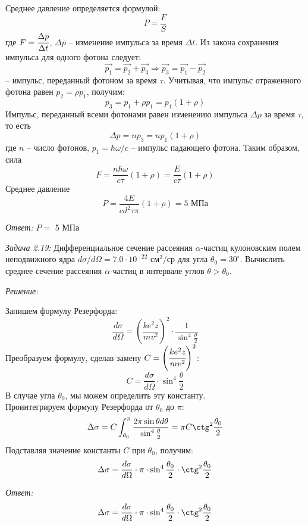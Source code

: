 Среднее давление определяется формулой:
	\[ P = \frac{F}{S} \]
где \( F = \cfrac{\Delta p}{\Delta t} \), 
	\( \Delta p \) -- изменение импульса за время \( \Delta t \).
Из закона сохранения импульса для одного фотона следует:
	\[ 
		\vec{p_1} = \vec{p_2} + \vec{p_3} \Rightarrow 
		\vec{p_3} = \vec{p_1} - \vec{p_2}
	\]
-- импульс, переданный фотоном за время \( \tau \). Учитывая,
что импульс отраженного фотона равен \( p_2 = \rho p_1 \),
получим:
	\[ p_3 = p_1 + \rho p_1 = p_1(1+\rho) \]
Импульс, переданный всеми фотонами равен изменению импульса 
\( \Delta p \) за время \( \tau \), то есть
	\[ \Delta p = np_3 = np_1(1+\rho) \]
где \( n \) -- число фотонов, \( p_1 = \hbar\omega/c \) --
импульс падающего фотона. Таким образом, сила
	\[ 
		F = \frac{n\hbar\omega}{c\tau}(1+\rho) 
		  = \frac{E}{c\tau}(1+\rho)
	\]
Среднее давление
	\[ P = \frac{4E}{cd^2\tau\pi}(1+\rho) = 5\text{ МПа} \]

\emph{Ответ:} \( P = \) 5 МПа

\newpage


\emph{Задача 2.19: }
Дифференциальное сечение рассеяния \( \alpha \)-частиц кулоновским полем неподвижного 
ядра \( d\sigma/d\Omega = 7.0\cdot10^{-22} \text{ см}^2/\text{ср} \)
для угла \( \theta_0 = 30^{\circ} \). Вычислить среднее сечение рассеяния 
\( \alpha \)-частиц в интервале углов \( \theta > \theta_0 \).

\emph{Решение:}

Запишем формулу Резерфорда:
\[ 
	\frac{d\sigma}{d\Omega} = 
	\left(\frac{ke^2z}{mv^2}\right)^2\cdot\frac{1}{\sin^4\frac{\theta}{2}}
\]
Преобразуем формулу, сделав замену \( C = \left(\cfrac{ke^2z}{mv^2}\right)^2 \):
\[ 
	C = \frac{d\sigma}{d\Omega}\cdot\sin^4\frac{\theta}{2}
\]
В случае угла \( \theta_0 \), мы можем определить эту константу.\\
Проинтегрируем формулу Резерфорда от \( \theta_0 \) до \( \pi \):
\[
	\Delta\sigma = C\int_{\theta_0}^{\pi}\frac{2\pi\sin\theta d\theta}
	{\sin^4\frac{\theta}{2}} = \pi C\ctg^2\frac{\theta_0}{2}
\]
Подставляя значение константы \( C \) при \( \theta_0 \), получим:
\[
	\Delta\sigma = \frac{d\sigma}{d\Omega}\cdot\pi\cdot\sin^4\frac{\theta_0}{2}
	\cdot\ctg^2\frac{\theta_0}{2}
\]

\emph{Ответ:}
\[
	\Delta\sigma = \frac{d\sigma}{d\Omega}\cdot\pi\cdot\sin^4\frac{\theta_0}{2}
	\cdot\ctg^2\frac{\theta_0}{2}
\]

\newpage

